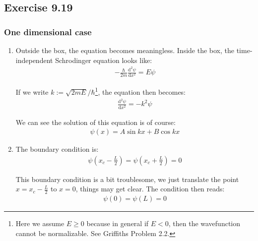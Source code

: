 \documentclass[]{ctexart}
\newcommand{\di}{\mathrm{d}}
\begin{document}
	\subsection{Exercise 9.19}
		\subsubsection{One dimensional case}
			\begin{enumerate}
				\item Outside the box, the equation becomes meaningless. Inside the box, the time-independent Schrodinger equation looks like:
					\begin{equation*}
						\begin{aligned}
							-\frac{\hbar}{2m}\frac{\di ^2 \psi}{\di x^2}=E\psi
						\end{aligned}
					\end{equation*}
				
				If we write $k:=\sqrt{2mE}/\hbar$\footnote{Here we assume $E\geq 0$ because in general if $E<0$, then the wavefunction cannot be normalizable. See Griffiths Problem 2.2.}, the equation then becomes:
					\begin{equation*}
						\begin{aligned}
							\frac{\di^2\psi}{\di x^2}=-k^2\psi
						\end{aligned}
					\end{equation*}
			
				We can see the solution of this equation is of course:
					\begin{equation*}
						\begin{aligned}
							\psi(x)=A\sin kx+B\cos kx
						\end{aligned}
					\end{equation*}
				
				\item The boundary condition is:
					\begin{equation*}
						\begin{aligned}
							\psi\left( x_c-\frac{L}{2}\right) =\psi\left( x_c+\frac{L}{2}\right)=0
						\end{aligned}
					\end{equation*}
				
				This boundary condition is a bit troublesome, we just translate the point $x=x_c-\frac{L}{2}$ to $x=0$, things may get clear. The condition then reads:
					\begin{equation*}
						\begin{aligned}
							\psi(0)=\psi(L)=0
						\end{aligned}
					\end{equation*}
				

\end{enumerate}
\end{document}
